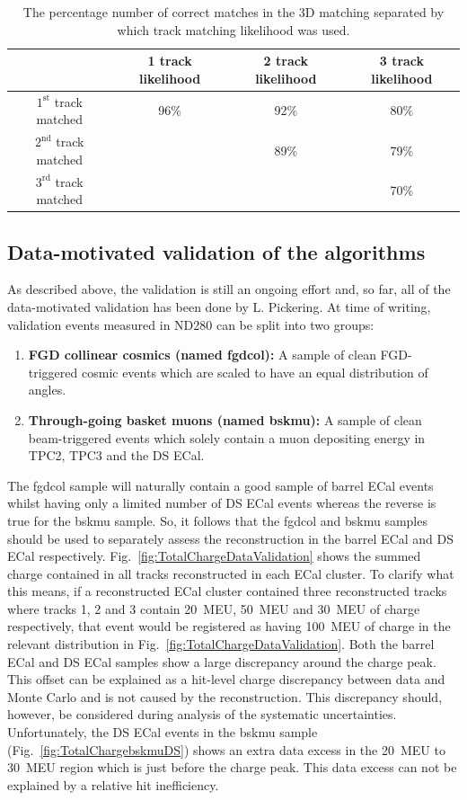 \begin{table}
  \begin{tabular}{c | c c c }
   & 1 track likelihood & 2 track likelihood & 3 track likelihood \\ \hline \hline
   $1^{\textrm{st}}$ track matched& 96$\%$ & 92$\%$ & 80$\%$ \\
   $2^{\textrm{nd}}$ track matched&  & 89$\%$ & 79$\%$ \\
   $3^{\textrm{rd}}$ track matched&  &  & 70$\%$ \\
  \end{tabular}
  \caption{The percentage number of correct matches in the 3D matching separated by which track matching likelihood was used.}
  \label{table:PercentageCorrect3DMatching}
\end{table}

\subsection{Data-motivated validation of the algorithms}
\label{subsec:DataMotivatedValidation}
As described above, the validation is still an ongoing effort and, so far, all of the data-motivated validation has been done by L. Pickering.  At time of writing, validation events  measured in ND280 can be split into two groups:
\begin{enumerate}
\item \textbf{FGD collinear cosmics (named fgdcol):} A sample of clean FGD-triggered cosmic events which are scaled to have an equal distribution of angles.
\item \textbf{Through-going basket muons (named bskmu):} A sample of clean beam-triggered events which solely contain a muon depositing energy in TPC2, TPC3 and the DS ECal.
\end{enumerate}
The fgdcol sample will naturally contain a good sample of barrel ECal events whilst having only a limited number of DS ECal events whereas the reverse is true for the bskmu sample.  So, it follows that the fgdcol and bskmu samples should be used to separately assess the reconstruction in the barrel ECal and DS ECal respectively. 
\newline
\newline
Fig.~\ref{fig:TotalChargeDataValidation} shows the summed charge contained in all tracks reconstructed in each ECal cluster.  To clarify what this means, if a reconstructed ECal cluster contained three reconstructed tracks where tracks 1, 2 and 3 contain 20~MEU, 50~MEU and 30~MEU of charge respectively, that event would be registered as having 100~MEU of charge in the relevant distribution in Fig.~\ref{fig:TotalChargeDataValidation}.  Both the barrel ECal and DS ECal samples show a large discrepancy around the charge peak.  This offset can be explained as a hit-level charge discrepancy between data and Monte Carlo and is not caused by the reconstruction.  This discrepancy should, however, be considered during analysis of the systematic uncertainties.  Unfortunately, the DS ECal events in the bskmu sample (Fig.~\ref{fig:TotalChargebskmuDS}) shows an extra data excess in the 20~MEU to 30~MEU region which is just before the charge peak.  This data excess can not be explained by a relative hit inefficiency. 
